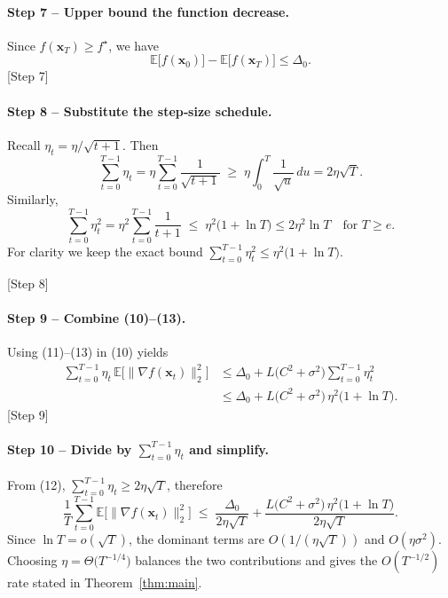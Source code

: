\documentclass{article}
\begin{document}
\paragraph{Step 7 – Upper bound the function decrease.}
Since $f(\mathbf{x}_T)\ge f^\star$, we have
\[
\mathbb{E}\!\bigl[f(\mathbf{x}_0)\bigr]-\mathbb{E}\!\bigl[f(\mathbf{x}_T)\bigr]
\le \Delta_0 .
\tag{11}
\]
[Step 7]

\paragraph{Step 8 – Substitute the step‑size schedule.}
Recall $\eta_t=\eta/\sqrt{t+1}$. Then
\[
\sum_{t=0}^{T-1}\eta_t
   =\eta\sum_{t=0}^{T-1}\frac{1}{\sqrt{t+1}}
   \;\ge\; \eta\int_{0}^{T}\frac{1}{\sqrt{u}}\,du
   =2\eta\sqrt{T}.
\tag{12}
\]
Similarly,
\[
\sum_{t=0}^{T-1}\eta_t^{2}
   =\eta^{2}\sum_{t=0}^{T-1}\frac{1}{t+1}
   \;\le\; \eta^{2}\bigl(1+\ln T\bigr)
   \le 2\eta^{2}\ln T\quad\text{for }T\ge e.
\tag{13}
\]
For clarity we keep the exact bound $\sum_{t=0}^{T-1}\eta_t^{2}\le\eta^{2}\bigl(1+\ln T\bigr)$.

[Step 8]

\paragraph{Step 9 – Combine (10)–(13).}
Using (11)–(13) in (10) yields
\[
\begin{aligned}
\sum_{t=0}^{T-1}\eta_t\,
\mathbb{E}\!\bigl[\|\nabla f(\mathbf{x}_t)\|_2^{2}\bigr]
&\le
\Delta_0
+ L\bigl(C^{2}+\sigma^{2}\bigr)
   \sum_{t=0}^{T-1}\eta_t^{2}
\\[4pt]
&\le
\Delta_0
+ L\bigl(C^{2}+\sigma^{2}\bigr)\,
   \eta^{2}\bigl(1+\ln T\bigr).
\end{aligned}
\tag{14}
\]
[Step 9]

\paragraph{Step 10 – Divide by $\sum_{t=0}^{T-1}\eta_t$ and simplify.}
From (12), $\sum_{t=0}^{T-1}\eta_t\ge 2\eta\sqrt{T}$, therefore
\[
\frac{1}{T}\sum_{t=0}^{T-1}
\mathbb{E}\!\bigl[\|\nabla f(\mathbf{x}_t)\|_2^{2}\bigr]
\;\le\;
\frac{ \Delta_0 }{ 2\eta\sqrt{T} }
   +\frac{ L\bigl(C^{2}+\sigma^{2}\bigr)\,\eta^{2}\bigl(1+\ln T\bigr) }
          { 2\eta\sqrt{T} } .
\tag{15}
\]
Since $\ln T = o(\sqrt{T})$, the dominant terms are $O(1/(\eta\sqrt{T}))$ and $O(\eta\sigma^{2})$.
Choosing $\eta = \Theta\!\bigl(T^{-1/4}\bigr)$ balances the two contributions and gives the $O(T^{-1/2})$ rate stated in Theorem~\ref{thm:main}.
\end{document}
